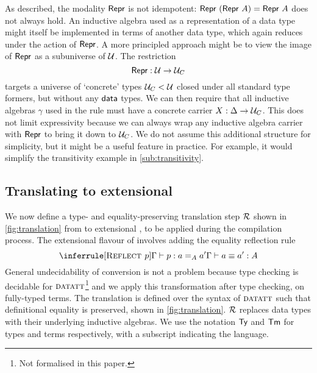 As described, the modality $\textsf{Repr}$ is not idempotent: $\textsf{Repr}\
(\textsf{Repr}\ A) = \textsf{Repr}\ A$ does not always hold. An inductive algebra used as a
representation of a data type might itself be implemented in terms of another
data type, which again reduces under the action of $\textsf{Repr}$. A more principled
approach might be to view the image of $\textsf{Repr}$ as a subuniverse of $\mathcal{U}$. The
restriction
$$
\textsf{Repr} : \mathcal{U} \to \mathcal{U}_C
$$
targets a universe of `concrete' types $\mathcal{U}_C < \mathcal{U}$ closed under all
standard type formers, but without any $\textsf{data}$ types. We can
then require that all inductive algebras $\gamma$ used in the rule
\hyperlink{Data-Form}{\axiom{Data-Form}} must have a concrete carrier $X : \Delta \to \mathcal{U}_C$. This
does not limit expressivity because we can always wrap any inductive algebra
carrier with $\textsf{Repr}$ to bring it down to $\mathcal{U}_C$. We do not assume this
additional structure for simplicity, but it might be a useful feature in
practice. For example, it would simplify the transitivity example in
\cref{sub:transitivity}.

\subsection{Translating to extensional \langmltt} \label{sub:translation}

We now define a type- and equality-preserving translation step $\mathcal{R}$ shown in
\cref{fig:translation} from \lambdadata to extensional \langmltt, to be
applied during the compilation process. The extensional flavour of \lambdamltt
involves adding the equality reflection rule
\[
\inferrule[\axiom{Reflect $p$}]{\Gamma \vdash p : a =_A a'}{\Gamma \vdash a \equiv a' : A}
\]
General undecidability of conversion is not a problem because type checking is
decidable for ${\textsc{datatt}}$\footnote{Not formalised in this paper.} and we
apply this transformation after type checking, on fully-typed terms. The
translation is defined over the syntax of ${\textsc{datatt}}$ \cite{Boulier2017-cm}
such that definitional equality is preserved, shown in
\cref{fig:translation}. $\mathcal{R}$ replaces data types with their underlying inductive
algebras. We use the notation $\textsf{Ty}$ and $\textsf{Tm}$ for types and terms respectively,
with a subscript indicating the language.

